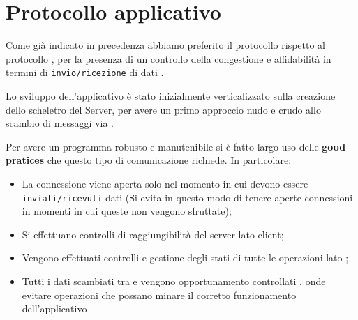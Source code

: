 \chapter{Protocollo applicativo}
  Come già indicato in precedenza abbiamo preferito il protocollo  rispetto al protocollo , per la presenza di un controllo della congestione e affidabilità in termini di \texttt{invio/ricezione} di dati\footnotemark {} .

  Lo sviluppo dell'applicativo è stato inizialmente verticalizzato sulla creazione dello scheletro del Server, per avere un primo approccio nudo e crudo allo scambio di messaggi via .

  Per avere un programma robusto e manutenibile si è fatto largo uso delle \textbf{good pratices} che questo tipo di comunicazione richiede. In particolare:
  \begin{itemize}
    \item La connessione viene aperta solo nel momento in cui devono essere \texttt{inviati/ricevuti} dati (Si evita in questo modo di tenere aperte connessioni in momenti in cui queste non vengono sfruttate);
    \item Si effettuano controlli di raggiungibilità del server lato client\footnotemark {};
    \item Vengono effettuati controlli e gestione degli stati di tutte le operazioni lato ;
    \item Tutti i dati scambiati tra  e  vengono opportunamento controllati \footnotemark {}, onde evitare operazioni che possano minare il corretto funzionamento dell'applicativo
  \end{itemize}
